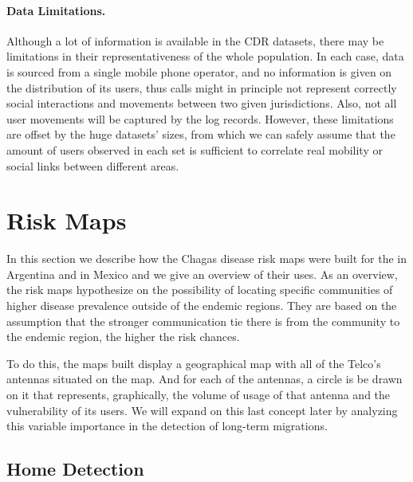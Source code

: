 \paragraph{Data Limitations.}
Although a lot of information is available in the CDR datasets, there may be limitations in their representativeness of the whole population. In each case, data is sourced from a single mobile phone operator, and no information is given on the distribution of its users, thus calls might in principle not represent correctly social interactions and movements between two given jurisdictions. Also, not all user movements will be captured by the log records. However, these limitations are offset by the huge datasets' sizes, from which we can safely assume that the amount of users observed in each set is sufficient to correlate real mobility or social links between different areas.






\section{ Risk Maps}\label{methods}

In this section we describe how the Chagas disease risk maps were built for the in Argentina and in Mexico and we give an overview of their uses. As an overview, the risk maps hypothesize on the possibility of locating specific communities of higher disease prevalence outside of the endemic regions. They are based on the assumption that the stronger communication tie there is from the community to the endemic region, the higher the risk chances.

To do this, the maps built display a geographical map with all of the Telco's antennas situated on the map. And for each of the antennas, a circle is be drawn on it that represents, graphically, the volume of usage of that antenna and the vulnerability of its users. We will expand on this last concept later by analyzing this variable importance in the detection of long-term migrations.

\subsection{Home Detection}

